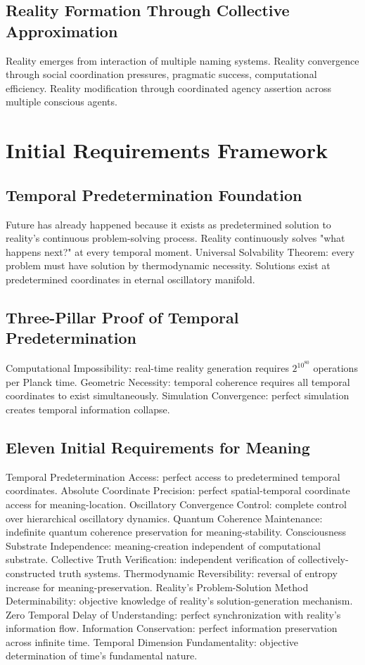 \documentclass[12pt,a4paper]{article}
\begin{document}
\subsection{Reality Formation Through Collective Approximation}

Reality emerges from interaction of multiple naming systems. Reality convergence through social coordination pressures, pragmatic success, computational efficiency. Reality modification through coordinated agency assertion across multiple conscious agents.

\section{Initial Requirements Framework}

\subsection{Temporal Predetermination Foundation}

Future has already happened because it exists as predetermined solution to reality's continuous problem-solving process. Reality continuously solves "what happens next?" at every temporal moment. Universal Solvability Theorem: every problem must have solution by thermodynamic necessity. Solutions exist at predetermined coordinates in eternal oscillatory manifold.

\subsection{Three-Pillar Proof of Temporal Predetermination}

Computational Impossibility: real-time reality generation requires $2^{10^{80}}$ operations per Planck time. Geometric Necessity: temporal coherence requires all temporal coordinates to exist simultaneously. Simulation Convergence: perfect simulation creates temporal information collapse.

\subsection{Eleven Initial Requirements for Meaning}

Temporal Predetermination Access: perfect access to predetermined temporal coordinates. Absolute Coordinate Precision: perfect spatial-temporal coordinate access for meaning-location. Oscillatory Convergence Control: complete control over hierarchical oscillatory dynamics. Quantum Coherence Maintenance: indefinite quantum coherence preservation for meaning-stability. Consciousness Substrate Independence: meaning-creation independent of computational substrate. Collective Truth Verification: independent verification of collectively-constructed truth systems. Thermodynamic Reversibility: reversal of entropy increase for meaning-preservation. Reality's Problem-Solution Method Determinability: objective knowledge of reality's solution-generation mechanism. Zero Temporal Delay of Understanding: perfect synchronization with reality's information flow. Information Conservation: perfect information preservation across infinite time. Temporal Dimension Fundamentality: objective determination of time's fundamental nature.
\end{document}
